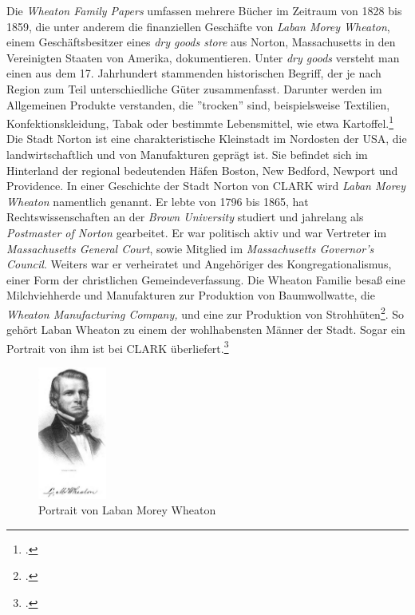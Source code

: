 \documentclass[12pt,a4paper]{article}
\begin{document}
Die \textit{Wheaton Family Papers} umfassen mehrere Bücher im Zeitraum von 1828 bis 1859, die unter anderem die finanziellen Geschäfte von \textit{Laban Morey Wheaton}, einem Geschäftsbesitzer eines \textit{dry goods store} aus Norton, Massachusetts in den Vereinigten Staaten von Amerika, dokumentieren. Unter \textit{dry goods} versteht man einen aus dem 17. Jahrhundert stammenden historischen Begriff, der je nach Region zum Teil unterschiedliche Güter zusammenfasst. Darunter werden im Allgemeinen Produkte verstanden, die ''trocken'' sind, beispielsweise Textilien, Konfektionskleidung, Tabak oder bestimmte Lebensmittel, wie etwa Kartoffel.\footcite[Definition von \textit{Dry Goods}, \protect\url{chestofbooks.com/reference/Dictionary-of-Dry-Goods/Dry-Goods.html}, 23.05.2019,][]{cole2015complete}
\\
Die Stadt Norton ist eine charakteristische Kleinstadt im Nordosten der USA, die landwirtschaftlich und von Manufakturen geprägt ist. Sie befindet sich im Hinterland der regional bedeutenden Häfen Boston, New Bedford, Newport und Providence. In einer Geschichte der Stadt Norton von CLARK wird \textit{Laban Morey Wheaton} namentlich genannt. Er lebte von 1796 bis 1865, hat Rechtswissenschaften an der \textit{Brown University} studiert und jahrelang als \textit{Postmaster of Norton} gearbeitet. Er war politisch aktiv und war Vertreter im \textit{Massachusetts General Court}, sowie Mitglied im \textit{Massachusetts Governor's Council}. Weiters war er verheiratet und Angehöriger des Kongregationalismus, einer Form der christlichen Gemeindeverfassung. Die Wheaton Familie besaß eine Milchviehherde und Manufakturen zur Produktion von Baumwollwatte, die \textit{Wheaton Manufacturing Company,} und eine zur Produktion von Strohhüten\footcite[][S.6]{tomasek2013encoding}. So gehört Laban Wheaton zu einem der wohlhabensten Männer der Stadt. Sogar ein Portrait von ihm ist bei CLARK überliefert.\footcite[][S.496]{clark1859history} 
\begin{figure}[H]
\centering
	\includegraphics[width=0.2\textwidth]{img/LMwheaton.jpg}  
    \caption[Portrait von Laban Morey Wheaton, CLARK, George Faber: A History of the Town of Norton, Bristol County, Massachusetts, from 1669-1859.
Crosby, Nichols, and Company, and author at Norton, 1859, S.497.]{Portrait von Laban Morey Wheaton} \label{fig:LMwheaton}
\end{figure} 
\end{document}
